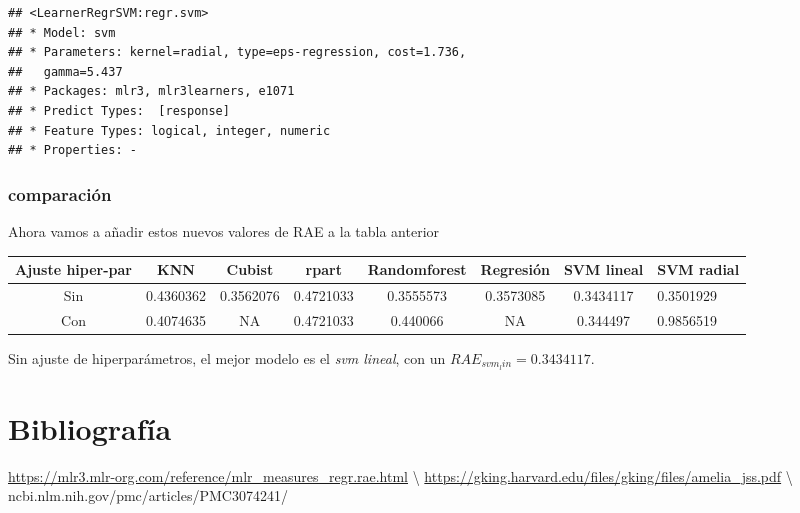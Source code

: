 \documentclass[
  11pt,
  a4paper,
]{article}
\begin{document}
\begin{verbatim}
## <LearnerRegrSVM:regr.svm>
## * Model: svm
## * Parameters: kernel=radial, type=eps-regression, cost=1.736,
##   gamma=5.437
## * Packages: mlr3, mlr3learners, e1071
## * Predict Types:  [response]
## * Feature Types: logical, integer, numeric
## * Properties: -
\end{verbatim}

\subsubsection{comparación}

Ahora vamos a añadir estos nuevos valores de RAE a la tabla anterior

\begin{center}
\begin{tabular}{ |c|c|c|c|c|c|c| } 
\hline
\textbf{Ajuste hiper-par}           & \textbf{KNN}          & \textbf{Cubist}      &\textbf{rpart}      &\textbf{Randomforest}      &\textbf{Regresión}      &\textbf{SVM lineal}      &\textbf{SVM radial} \\
 \hline \hline 
 Sin & 0.4360362 & 0.3562076 & 0.4721033 & 0.3555573 & 0.3573085 & 0.3434117 & 0.3501929 \\
 \hline
 Con & 0.4074635 & NA & 0.4721033 & 0.440066 & NA & 0.344497 & 0.9856519
 \\
 \hline
\end{tabular}
\end{center}

Sin ajuste de hiperparámetros, el mejor modelo es el \emph{svm lineal},
con un \(RAE_{svm_lin} = 0.3434117\). \newpage

\section{Bibliografía}

\url{https://mlr3.mlr-org.com/reference/mlr_measures_regr.rae.html}
\textbackslash{}
\url{https://gking.harvard.edu/files/gking/files/amelia_jss.pdf}
\textbackslash{} ncbi.nlm.nih.gov/pmc/articles/PMC3074241/
\end{document}
